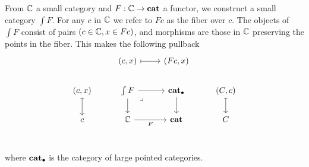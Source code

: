 \begin{defn}
  From $\mathbb{C}$ a small category and $F : \mathbb{C} \to \mathbf{cat}$
  a functor, we construct a small category $\int F$.
  For any $c$ in $\mathbb{C}$ we refer to $F c$ as the fiber over $c$.
  The objects of $\int F$ consist of pairs $(c \in \mathbb{C}, x \in F c)$,
  and morphisms are those in $\mathbb{C}$ preserving the points in the fiber.
  This makes the following pullback
  \[\begin{tikzcd}
    & {(c,x)} & {(Fc, x)} \\
    {(c,x)} & {\int F} & \ptcat & {(C,c)} \\
    c & \catC & \cat & C \\
    & {}
    \arrow[maps to, from=1-2, to=1-3]
    \arrow[maps to, from=2-1, to=3-1]
    \arrow[from=2-2, to=2-3]
    \arrow[from=2-2, to=3-2]
    \arrow["\lrcorner"{anchor=center, pos=0.125}, draw=none, from=2-2, to=3-3]
    \arrow[from=2-3, to=3-3]
    \arrow[maps to, from=2-4, to=3-4]
    \arrow["F"', from=3-2, to=3-3]
  \end{tikzcd}\]
  where $\mathbf{cat}_\bullet$ is the category of large pointed categories.
\end{defn}

\medskip

